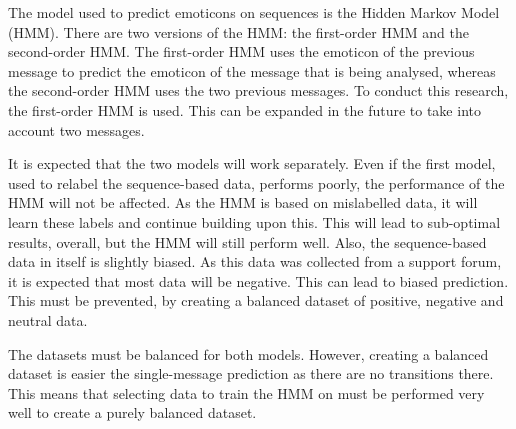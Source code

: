 The model used to predict emoticons on sequences is the Hidden Markov Model (HMM). There are two versions of the HMM: the first-order HMM and the second-order HMM. The first-order HMM uses the emoticon of the previous message to predict the emoticon of the message that is being analysed, whereas the second-order HMM uses the two previous messages. To conduct this research, the first-order HMM is used. This can be expanded in the future to take into account two messages.

It is expected that the two models will work separately. Even if the first model, used to relabel the sequence-based data, performs poorly, the performance of the HMM will not be affected. As the HMM is based on mislabelled data, it will learn these labels and continue building upon this. This will lead to sub-optimal results, overall, but the HMM will still perform well. Also, the sequence-based data in itself is slightly biased. As this data was collected from a support forum, it is expected that most data will be negative. This can lead to biased prediction. This must be prevented, by creating a balanced dataset of positive, negative and neutral data. 

The datasets must be balanced for both models. However, creating a balanced dataset is easier the single-message prediction as there are no transitions there. This means that selecting data to train the HMM on must be performed very well to create a purely balanced dataset.


\begin{comment}
To summarize: in order to predict emoticons in sequence of messages, the positivity, neutrality or negativity of each message must be determined. By preprocessing each message and extracting features, the "gist" of each message is extracted. This "gist" is used to train a first-order Hidden Markov Model, which can then be used to predict the emoticon of messages. However, in order to label the training data correctly, first all messages must be labelled. To do this, a perceptron is used. When training all of the models, it is imperative to select balanced data to train each model in order to achieve optimal prediction.
\end{comment}
